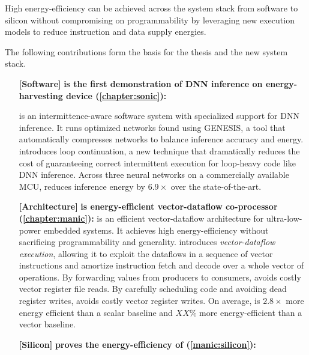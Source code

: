 \begin{adjustwidth}{1cm}{1cm}
High energy-efficiency can be achieved 
across the system stack from software to silicon without compromising on programmability by leveraging new execution models to reduce instruction and data supply energies.
% 

\end{adjustwidth}
% 
The following contributions form the basis for the thesis and the new system stack.

\begin{itemize}

\item[\textbf{[Software]}]
\textbf{\sonic is the first demonstration of DNN inference on energy-harvesting device (\autoref{chapter:sonic}): }

\sonic is an intermittence-aware software system with specialized support for DNN inference. 
% 
It runs optimized networks found using GENESIS, a tool that automatically compresses networks to balance inference accuracy and energy.
% 
\sonic introduces loop continuation, a new technique that dramatically reduces the cost of guaranteeing correct intermittent execution for loop-heavy code like DNN inference. 
% 
Across three neural networks on a commercially available MCU, \sonic reduces inference energy by $6.9\times$ over the state-of-the-art.
% 

\item[\textbf{[Architecture]}]
\textbf{\manic is energy-efficient vector-dataflow co-processor (\autoref{chapter:manic}): }
\manic is an efficient vector-dataflow architecture for ultra-low-power embedded systems.  
% 
It achieves high energy-efficiency without sacrificing programmability and generality.
% 
\manic introduces \emph{vector-dataflow execution}, allowing it to exploit the
dataflows in a sequence of vector instructions and amortize instruction
fetch and decode over a whole vector of operations.
%
By forwarding values from producers to consumers, \manic avoids costly vector register file reads.
% 
By carefully scheduling code and avoiding dead register writes, \manic avoids costly vector register writes.
% 
On average, \manic is $2.8\times$ more energy efficient than a scalar baseline and $XX\%$ more energy-efficient than a vector baseline.
% 

\item[\textbf{[Silicon]}]
\textbf{\manicsilicon proves the energy-efficiency of \manic (\autoref{manic:silicon}): }


\end{itemize}
